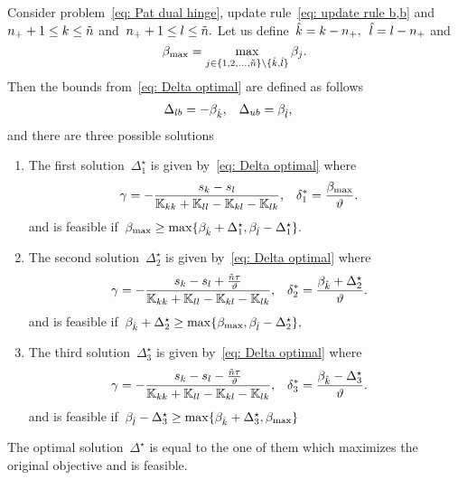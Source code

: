 \begin{lemma}
  Consider problem~\eqref{eq: Pat dual hinge}, update rule~\eqref{eq: update rule b,b} and~$n_{+} + 1 \leq k \leq \tilde{n}$ and~$n_{+} + 1 \leq l \leq \tilde{n}.$ Let us define~$\hat{k} = k - n_{+},$~$\hat{l} = l - n_{+}$ and
  \begin{equation*}
    \beta_{\max} = \max_{j \in \{1, 2, \ldots, \tilde{n} \} \setminus \{\hat{k}, \hat{l}\}} \beta_j.
  \end{equation*}
  Then the bounds from~\eqref{eq: Delta optimal} are defined as follows
  \begin{align*}
    \Delta_{lb} & = - \beta_{\hat{k}}, &
    \Delta_{ub} & = \beta_{\hat{l}},
  \end{align*}
  and there are three possible solutions
  \begin{enumerate}
    \item The first solution~$\Delta^{\star}_1$ is given by~\eqref{eq: Delta optimal} where
    \begin{align*}
      \gamma
        & = -\frac{s_k - s_l}{\mathbb{K}_{kk} + \mathbb{K}_{ll} - \mathbb{K}_{kl} - \mathbb{K}_{lk}}, &
      \delta^{*}_1
        & = \frac{\beta_{\max}}{\vartheta}.
    \end{align*}
    and is feasible if~$\beta_{\max} \geq \max\{\beta_{\hat{k}} + \Delta^{\star}_1, \beta_{\hat{l}} - \Delta^{\star}_1\}.$
    \item The second solution~$\Delta^{\star}_2$ is given by~\eqref{eq: Delta optimal} where
    \begin{align*}
      \gamma
        & = -\frac{s_k - s_l + \frac{\tilde{n} \tau}{\vartheta}}{\mathbb{K}_{kk} + \mathbb{K}_{ll} - \mathbb{K}_{kl} - \mathbb{K}_{lk}}, &
      \delta^{*}_2
        & = \frac{\beta_{\hat{k}} + \Delta^{\star}_2}{\vartheta}.
    \end{align*}
    and is feasible if~$\beta_{\hat{k}} + \Delta^{\star}_2 \geq \max\{\beta_{\max} , \beta_{\hat{l}} - \Delta^{\star}_2\},$
    \item The third solution~$\Delta^{\star}_3$ is given by~\eqref{eq: Delta optimal} where
    \begin{align*}
      \gamma
        & = -\frac{s_k - s_l - \frac{\tilde{n} \tau}{\vartheta}}{\mathbb{K}_{kk} + \mathbb{K}_{ll} - \mathbb{K}_{kl} - \mathbb{K}_{lk}}, &
      \delta^{*}_3
        & = \frac{\beta_{\hat{k}} - \Delta^{\star}_3}{\vartheta}.
    \end{align*}
    and is feasible if~$\beta_{\hat{l}} - \Delta^{\star}_3 \geq \max\{\beta_{\hat{k}} + \Delta^{\star}_3, \beta_{\max}\}$
  \end{enumerate}
  The optimal solution~$\Delta^{\star}$ is equal to the one of them which maximizes the original objective and is feasible.
\end{lemma}

